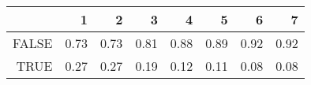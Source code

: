 \begin{table}[ht]
\centering
\begin{tabular}{rrrrrrrr}
  \hline
 & 1 & 2 & 3 & 4 & 5 & 6 & 7 \\ 
  \hline
FALSE & 0.73 & 0.73 & 0.81 & 0.88 & 0.89 & 0.92 & 0.92 \\ 
  TRUE & 0.27 & 0.27 & 0.19 & 0.12 & 0.11 & 0.08 & 0.08 \\ 
   \hline
\end{tabular}
\end{table}
